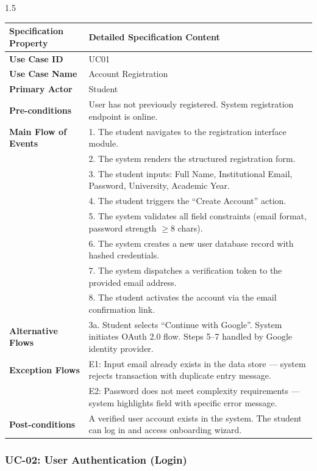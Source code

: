 \documentclass[12pt,a4paper]{report}
\begin{document}
\begin{spacing}{1.5}
		\begin{longtable}{|p{4.5cm}|p{10.5cm}|}
			\hline
			\rowcolor{gray!20}\textbf{Specification Property} & \textbf{Detailed Specification Content} \\ \hline
			\textbf{Use Case ID} & UC01 \\ \hline
			\textbf{Use Case Name} & Account Registration \\ \hline
			\textbf{Primary Actor} & Student \\ \hline
			\textbf{Pre-conditions} & User has not previously registered. System registration endpoint is online. \\ \hline
			\textbf{Main Flow of Events} &
			1. The student navigates to the registration interface module.\\
			& 2. The system renders the structured registration form.\\
			& 3. The student inputs: Full Name, Institutional Email, Password, University, Academic Year.\\
			& 4. The student triggers the ``Create Account'' action.\\
			& 5. The system validates all field constraints (email format, password strength $\geq$8 chars).\\
			& 6. The system creates a new user database record with hashed credentials.\\
			& 7. The system dispatches a verification token to the provided email address.\\
			& 8. The student activates the account via the email confirmation link.\\ \hline
			\textbf{Alternative Flows} & 3a. Student selects ``Continue with Google''. System initiates OAuth 2.0 flow. Steps 5--7 handled by Google identity provider. \\ \hline
			\textbf{Exception Flows} &
			E1: Input email already exists in the data store --- system rejects transaction with duplicate entry message. \\
			& E2: Password does not meet complexity requirements --- system highlights field with specific error message. \\ \hline
			\textbf{Post-conditions} & A verified user account exists in the system. The student can log in and access onboarding wizard. \\ \hline
		\end{longtable}
		
		\subsubsection{UC-02: User Authentication (Login)}
		

\end{spacing}
\end{document}
